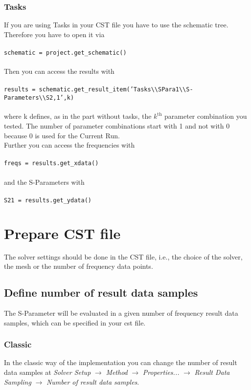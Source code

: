 \documentclass[12pt,accentcolor=tud2b, colorback, openany]{tudreport}
\begin{document}
	\subsubsection{Tasks}
	If you are using Tasks in your CST file you have to use the schematic tree. Therefore you have to open it via\\
	\\
	\texttt{schematic = project.get\_schematic()}\\
	\\
	Then you can access the results with\\
	\\
	\texttt{results = schematic.get\_result\_item('Tasks\textbackslash\textbackslash SPara1\textbackslash\textbackslash S-Parameters\textbackslash\textbackslash S2,1',k)}\\
	\\
	where k defines, as in the part without tasks, the $k^{\text{th}}$ parameter combination you tested. The number of parameter combinations start with 1 and not with 0 because 0 is used for the Current Run.\\
	Further you can access the frequencies with\\
	\\
	\texttt{freqs = results.get\_xdata()}\\
	\\
	and the S-Parameters with\\
	\\
	\texttt{S21 = results.get\_ydata()}
	
	
	\section{Prepare CST file}
	
	The solver settings should be done in the CST file, i.e., the choice of the solver, the mesh or the number of frequency data points.	
	
	\subsection{Define number of result data samples}
	The S-Parameter will be evaluated in a given number of frequency result data samples, which can be specified in your cst file.
	\subsubsection{Classic}
	In the classic way of the implementation you can change the number of result data samples at \textit{Solver Setup} $\rightarrow$ \textit{Method} $\rightarrow$ \textit{Properties...} $\rightarrow$ \textit{Result Data Sampling} $\rightarrow$ \textit{Number of result data samples}.
\end{document}
